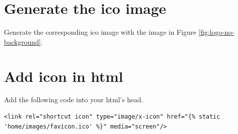 \section{Generate the ico image}
Generate the corresponding ico image with the image in Figure \ref{fig:logo-no-background}.


\section{Add icon in html}
Add the following code into your html's head. 
\lstset{language=Html}
\begin{lstlisting}
<link rel="shortcut icon" type="image/x-icon" href="{% static 'home/images/favicon.ico' %}" media="screen"/>

\end{lstlisting}


